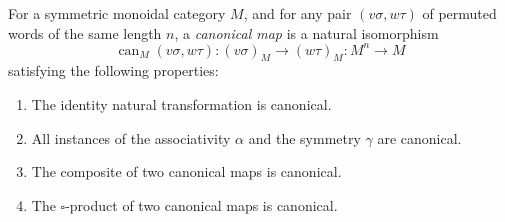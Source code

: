 For a symmetric monoidal category $M$, and for any pair $(v\sigma, w\tau)$ of permuted words of the same length $n$, a \emph{canonical map} is a natural isomorphism
$$\operatorname{can}_M(v\sigma, w\tau) : (v\sigma)_M \longrightarrow (w\tau)_M : M^n \to M$$
satisfying the following properties:
\begin{enumerate}
\item The identity natural transformation is canonical.
\item All instances of the associativity $\alpha$ and the symmetry $\gamma$ are canonical.
\item The composite of two canonical maps is canonical.
\item The $\square$-product of two canonical maps is canonical.
\end{enumerate}
